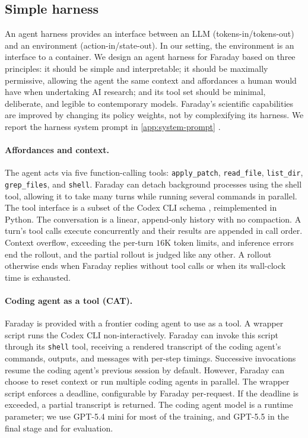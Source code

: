 \documentclass[garamond,a4paper]{inherent}
\renewcommand{\sectionautorefname}{Section}%
\renewcommand{\subsectionautorefname}{Section}%
\renewcommand{\subsubsectionautorefname}{Section}%
\DeclareRobustCommand{\appref}[1]{%
  \begingroup
  \renewcommand{\sectionautorefname}{Appendix}%
  \renewcommand{\subsectionautorefname}{Appendix}%
  \renewcommand{\subsubsectionautorefname}{Appendix}%
  \autoref{#1}%
  \endgroup}
\begin{document}
\subsection{Simple harness}
\label{sec:harness}

An agent harness provides an interface between an LLM (tokens-in/tokens-out) and an environment (action-in/state-out). In our setting, the environment is an interface to a container. We design an agent harness for Faraday based on three principles: it should be simple and interpretable; it should be maximally permissive, allowing the agent the same context and affordances a human would have when undertaking AI research; and its tool set should be minimal, deliberate, and legible to contemporary models.
Faraday's scientific capabilities are improved by changing its policy weights, not by complexifying its harness. We report the harness system prompt in \appref{app:system-prompt}.   

\paragraph{Affordances and context.}
The agent acts via five function-calling tools: \texttt{apply\_patch}, \texttt{read\_file}, \texttt{list\_dir}, \texttt{grep\_files}, and \texttt{shell}. Faraday can detach background processes using the shell tool, allowing it to take many turns while running several commands in parallel. 
The tool interface is a subset of the Codex CLI schema \citep{openai2025codex}, reimplemented in Python.
The conversation is a linear, append-only history with no compaction.
A turn's tool calls execute concurrently and their results are appended in call order.
Context overflow, exceeding the per-turn $16$K token limits, and inference errors end the rollout, and the partial rollout is judged like any other.
A rollout otherwise ends when Faraday replies without tool calls or when its wall-clock time is exhausted.

\paragraph{Coding agent as a tool (CAT).}
Faraday is provided with a frontier coding agent to use as a tool.
A wrapper script runs the Codex CLI non-interactively. 
Faraday can invoke this script through its \texttt{shell} tool, receiving a rendered transcript of the coding agent's commands, outputs, and messages with per-step timings.
Successive invocations resume the coding agent's previous session by default.
However, Faraday can choose to reset context or run multiple coding agents in parallel.
The wrapper script enforces a deadline, configurable by Faraday per-request. If the deadline is exceeded, a partial transcript is returned. 
The coding agent model is a runtime parameter; we use GPT-5.4 mini for most of the training, and GPT-5.5 in the final stage and for evaluation.
\end{document}
